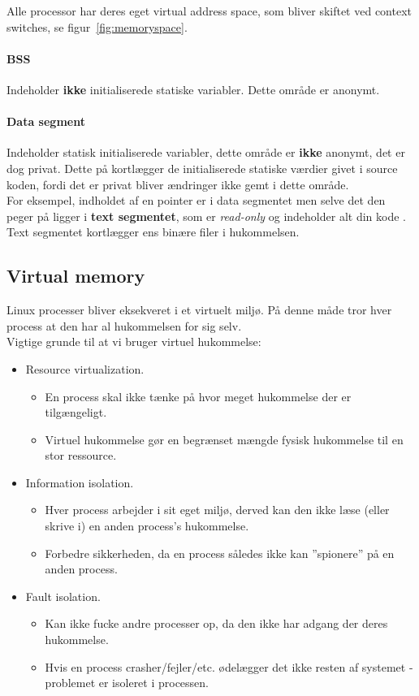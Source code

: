 Alle processor har deres eget virtual address space, som bliver skiftet ved context switches, se figur~\ref{fig:memoryspace}. 

\paragraph{BSS}
Indeholder \textbf{ikke} initialiserede statiske variabler. Dette område er anonymt.

\paragraph{Data segment}
Indeholder statisk initialiserede variabler, dette område er \textbf{ikke} anonymt, det er dog privat. Dette på kortlægger de initialiserede statiske værdier givet i source koden, fordi det er privat bliver ændringer ikke gemt i dette område.\\

For eksempel, indholdet af en pointer er i data segmentet  men selve det den peger på ligger i \textbf{text segmentet}, som er \textit{read-only} og indeholder alt din kode . Text segmentet kortlægger ens binære filer i hukommelsen.

\subsection{Virtual memory}
Linux processer bliver eksekveret i et virtuelt miljø. På denne måde tror hver process at den har al hukommelsen for sig selv.\\

Vigtige grunde til at vi bruger virtuel hukommelse:

\begin{itemize}
	\item Resource virtualization.
	\begin{itemize}
		\item En process skal ikke tænke på hvor meget hukommelse der er tilgængeligt.
		\item Virtuel hukommelse gør en begrænset mængde fysisk hukommelse til en stor ressource.
	\end{itemize}
	\item Information isolation.
	\begin{itemize}
		\item Hver process arbejder i sit eget miljø, derved kan den ikke læse (eller skrive i) en anden process's hukommelse.
		\item Forbedre sikkerheden, da en process således ikke kan ''spionere'' på en anden process.
	\end{itemize}
	\item Fault isolation.
	\begin{itemize}
		\item Kan ikke fucke andre processer op, da den ikke har adgang der deres hukommelse.
		\item Hvis en process crasher/fejler/etc. ødelægger det ikke resten af systemet - problemet er isoleret i processen.
	\end{itemize}
\end{itemize}

